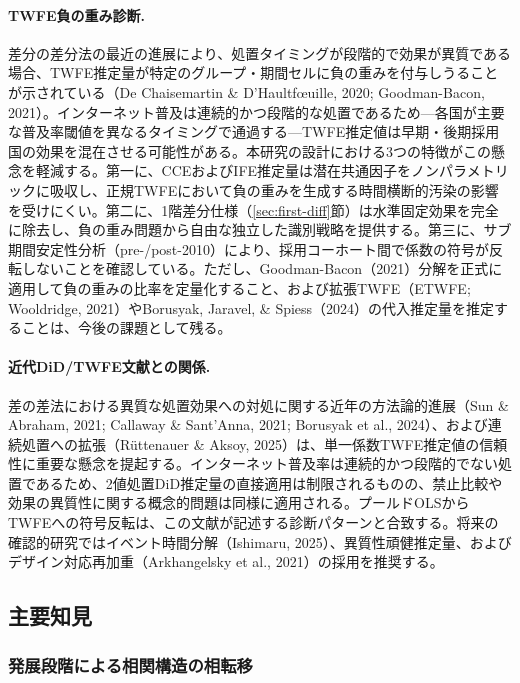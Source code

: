 \documentclass[a4paper,11pt,titlepage]{article}
\begin{document}
\paragraph{TWFE負の重み診断.}
差分の差分法の最近の進展により、処置タイミングが段階的で効果が異質である場合、TWFE推定量が特定のグループ・期間セルに負の重みを付与しうることが示されている（De Chaisemartin \& D'Haultf{\oe}uille, 2020; Goodman-Bacon, 2021）。インターネット普及は連続的かつ段階的な処置であるため---各国が主要な普及率閾値を異なるタイミングで通過する---TWFE推定値は早期・後期採用国の効果を混在させる可能性がある。本研究の設計における3つの特徴がこの懸念を軽減する。第一に、CCEおよびIFE推定量は潜在共通因子をノンパラメトリックに吸収し、正規TWFEにおいて負の重みを生成する時間横断的汚染の影響を受けにくい。第二に、1階差分仕様（\ref{sec:first-diff}節）は水準固定効果を完全に除去し、負の重み問題から自由な独立した識別戦略を提供する。第三に、サブ期間安定性分析（pre-/post-2010）により、採用コーホート間で係数の符号が反転しないことを確認している。ただし、Goodman-Bacon（2021）分解を正式に適用して負の重みの比率を定量化すること、および拡張TWFE（ETWFE; Wooldridge, 2021）やBorusyak, Jaravel, \& Spiess（2024）の代入推定量を推定することは、今後の課題として残る。

\paragraph{近代DiD/TWFE文献との関係.}
差の差法における異質な処置効果への対処に関する近年の方法論的進展（Sun \& Abraham, 2021; Callaway \& Sant'Anna, 2021; Borusyak et al., 2024）、および連続処置への拡張（R\"{u}ttenauer \& Aksoy, 2025）は、単一係数TWFE推定値の信頼性に重要な懸念を提起する。インターネット普及率は連続的かつ段階的でない処置であるため、2値処置DiD推定量の直接適用は制限されるものの、禁止比較や効果の異質性に関する概念的問題は同様に適用される。プールドOLSからTWFEへの符号反転は、この文献が記述する診断パターンと合致する。将来の確認的研究ではイベント時間分解（Ishimaru, 2025）、異質性頑健推定量、およびデザイン対応再加重（Arkhangelsky et al., 2021）の採用を推奨する。


\subsection{主要知見}\label{sec:main-findings}

\subsubsection{発展段階による相関構造の相転移}\label{sec:phase-transition}
\end{document}
